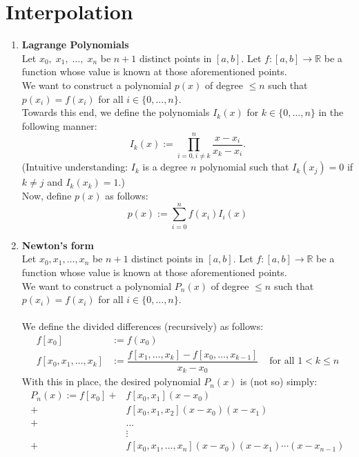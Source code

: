 \documentclass{article}
\begin{document}
\section{Interpolation}\label{sec:inter}
\begin{enumerate}
	\itemsep1em 
	\item \textbf{Lagrange Polynomials}\\
	Let $x_0,\;x_1,\;\ldots,\;x_{n}$ be $n+1$ distinct points in $[a, b].$ Let $f:[a, b] \to \mathbb{R}$ be a function whose value is known at those aforementioned points. \\
	We want to construct a polynomial $p(x)$ of degree $\le n$ such that $p(x_i) = f(x_i)$ for all $i \in \{0, \ldots, n\}.$\\
	Towards this end, we define the polynomials $I_k(x)$ for $k \in \{0, \ldots, n\}$ in the following manner:
	\[I_k(x) := \prod_{i = 0, i \neq k}^{n}\frac{x - x_i}{x_k - x_i}.\]
	(Intuitive understanding: $I_k$ is a degree $n$ polynomial such that $I_k(x_j) = 0$ if $k \neq j$ and $I_k(x_k) = 1.$)\\
	Now, define $p(x)$ as follows:
	\[p(x) := \sum_{i=0}^{n}f(x_i)I_i(x)\]
	\item \textbf{Newton's form}\\
	Let $x_0, x_1, \ldots, x_n$ be $n+1$ distinct points in $[a, b].$ Let $f:[a, b] \to \mathbb{R}$ be a function whose value is known at those aforementioned points. \\
	We want to construct a polynomial $P_n(x)$ of degree $\le n$ such that $p(x_i) = f(x_i)$ for all $i \in \{0, \ldots, n\}.$\\~\\
	We define the divided differences (recursively) as follows:
	\begin{align*} 
		f[x_0] &:= f(x_0)\\
		f[x_0, x_1, \ldots, x_k] &:= \dfrac{f[x_1, \ldots, x_k] - f[x_0, \ldots, x_{k-1}]}{x_k - x_0} & \text{ for all } 1 < k \le n
	\end{align*}
	With this in place, the desired polynomial $P_n(x)$ is (not so) simply:
	\begin{align*} 
		P_n(x) := f[x_0]  +& f[x_0, x_1](x - x_0)\\
						 +& f[x_0, x_1, x_2](x - x_0)(x - x_1)\\
						 +& \ldots\\
						  &\vdots\\
						 +& f[x_0, x_1, \ldots, x_n](x - x_0)(x - x_1)\cdots(x - x_{n-1})
	\end{align*}

\end{enumerate}
\end{document}
